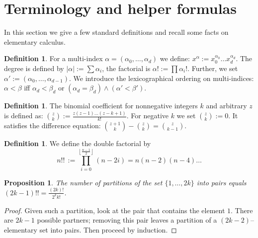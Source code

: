 \documentclass{amsart}
\newcommand{\coloneqq}{:=}
\theoremstyle{plain}
\newtheorem{proposition}[theorem]{Proposition}
\theoremstyle{definition}
\newtheorem{definition}[theorem]{Definition}
\theoremstyle{remark}
\begin{document}
\section{Terminology and helper formulas} \label{boring}
In this section 
we give a few standard definitions and recall some facts on elementary calculus. 
\begin{definition}\label{multiindex}
For a multi-index $\alpha=(\alpha_0,\ldots,\alpha_d)$ we define: $x^\alpha \coloneqq x_0^{\alpha_0}\ldots x_d^{\alpha_d}$. The degree is defined by $|\alpha |\coloneqq\sum\alpha_i$, the factorial is $\alpha! \coloneqq \prod \alpha_i!$. Further, we set
$\alpha'\coloneqq(\alpha_0,\ldots,\alpha_{d-1})$. We introduce the lexicographical ordering on multi-indices: $\alpha < \beta$ iff $\alpha_d < \beta_d$ or $(\alpha_d=\beta_d) \wedge (\alpha'<\beta')$.
\end{definition}
\begin{definition}
The binomial coefficient for nonnegative integers $k$ and arbitrary $z$ is defined as:
$\binom{z}{k} \coloneqq \frac{z(z-1)\ldots(z-k+1)}{k!}$. For negative $k$ we set $\binom{z}{k}\coloneqq 0$. It satisfies the difference equation: $\binom{z+1}{k}-\binom{z}{k} = \binom{z}{k-1}$.
\end{definition}
\begin{definition}\label{doublefactorial}
We define the double factorial by 
$$n!! \,\coloneqq \prod_{i=0}^{\left\lfloor\!\frac{n-1}{2}\!\right\rfloor }(n-2i)=n(n-2)(n-4)\ldots $$
\end{definition}
\begin{proposition}
The number of partitions of the set $\{1,\ldots,2k\}$ into pairs equals $(2k-1)!! = \frac{(2k)!}{2^kk!}$.
\end{proposition}
\begin{proof}
Given such a partition, look at the pair that contains the element $1$. There are $2k-1$ possible partners; removing this pair leaves a partition of a $(2k-2)$--elementary set into pairs. Then proceed by induction.
\end{proof}
\end{document}

